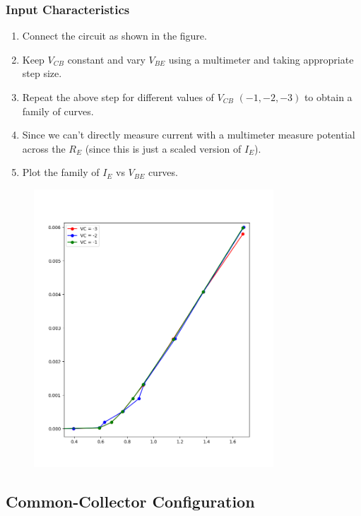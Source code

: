 \documentclass[12pt,a4paper]{article}
\begin{document}
\subsubsection{Input Characteristics}
\begin{enumerate}
    \item Connect the circuit as shown in the figure. 
    \item Keep $V_{CB}$ constant and vary $V_{BE}$ using a multimeter and taking appropriate step size.
    \item Repeat the above step for different values of $V_{CB}$ $(-1,-2,-3)$ to obtain a family of curves.
    \item Since we can't directly measure current with a multimeter measure potential across the $R_E$ (since this is just a scaled version of $I_E$).
    \item Plot the family of $I_E$ vs $V_{BE}$ curves.
\end{enumerate}
\begin{figure}[H]
    \centering
    \includegraphics[width=0.8\textwidth]{Experiment_6/figs/cb_ip.png}
\end{figure}                

\subsection{Common-Collector Configuration}
\end{document}
